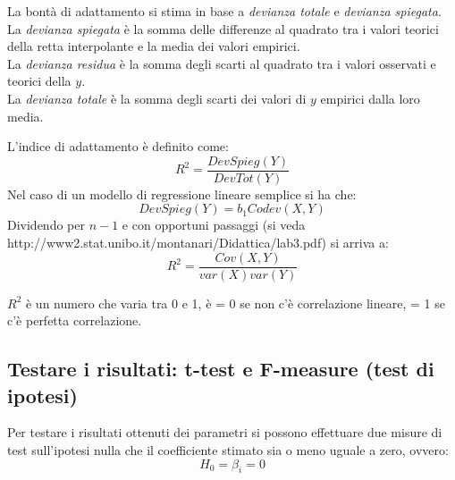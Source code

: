 \documentclass[]{article}
\begin{document}
La bontà di adattamento si stima in base a \textit{devianza totale} e
\textit{devianza spiegata}.\\
La \textit{devianza spiegata} è la somma delle differenze al quadrato tra i valori teorici della retta interpolante e la media dei valori empirici.\\
La \textit{devianza residua} è la somma degli scarti al quadrato tra i valori osservati e teorici della $y$. \\
La \textit{devianza totale} è la somma degli scarti dei valori di $y$ empirici dalla loro media.

L'indice di adattamento è definito come:
\begin{equation}
R^2 = \frac{DevSpieg(Y)}{DevTot(Y)}
\end{equation}
Nel caso di un modello di regressione lineare semplice si ha che:
\begin{equation}
DevSpieg(Y) = b_1 Codev(X, Y)
\end{equation}
Dividendo per $n-1$ e con opportuni passaggi (si veda http://www2.stat.unibo.it/montanari/Didattica/lab3.pdf) si arriva a:
\begin{equation}
R^2 = \frac{Cov(X, Y)}{var(X)var(Y)}
\end{equation}

$R^2$ è un numero che varia tra 0 e 1, è = 0 se non c'è correlazione lineare, = 1 se c'è perfetta correlazione.

\subsection{Testare i risultati: t-test e F-measure (test di ipotesi)}
Per testare i risultati ottenuti dei parametri si possono effettuare due misure di test sull'ipotesi nulla che il coefficiente stimato sia o meno uguale a zero, ovvero:
\begin{equation}
H_0 = \beta_i = 0
\end{equation}
\end{document}
